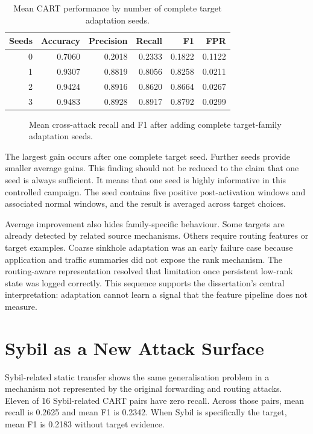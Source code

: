 \begin{table}[H]
\centering
\caption{Mean CART performance by number of complete target adaptation seeds.}
\label{tab:adaptation}
\begin{tabular}{rrrrrr}
\toprule
Seeds & Accuracy & Precision & Recall & F1 & FPR \\
\midrule
0 & 0.7060 & 0.2018 & 0.2333 & 0.1822 & 0.1122 \\
1 & 0.9307 & 0.8819 & 0.8056 & 0.8258 & 0.0211 \\
2 & 0.9424 & 0.8916 & 0.8620 & 0.8664 & 0.0267 \\
3 & 0.9483 & 0.8928 & 0.8917 & 0.8792 & 0.0299 \\
\bottomrule
\end{tabular}
\end{table}

\begin{figure}[H]
\centering

\caption{Mean cross-attack recall and F1 after adding complete target-family adaptation seeds.}
\label{fig:adaptation-curve}
\end{figure}

The largest gain occurs after one complete target seed. Further seeds provide smaller average gains. This finding should not be reduced to the claim that one seed is always sufficient. It means that one seed is highly informative in this controlled campaign. The seed contains five positive post-activation windows and associated normal windows, and the result is averaged across target choices.

Average improvement also hides family-specific behaviour. Some targets are already detected by related source mechanisms. Others require routing features or target examples. Coarse sinkhole adaptation was an early failure case because application and traffic summaries did not expose the rank mechanism. The routing-aware representation resolved that limitation once persistent low-rank state was logged correctly. This sequence supports the dissertation's central interpretation: adaptation cannot learn a signal that the feature pipeline does not measure.

\section{Sybil as a New Attack Surface}

Sybil-related static transfer shows the same generalisation problem in a mechanism not represented by the original forwarding and routing attacks. Eleven of 16 Sybil-related CART pairs have zero recall. Across those pairs, mean recall is 0.2625 and mean F1 is 0.2342. When Sybil is specifically the target, mean F1 is 0.2183 without target evidence.

